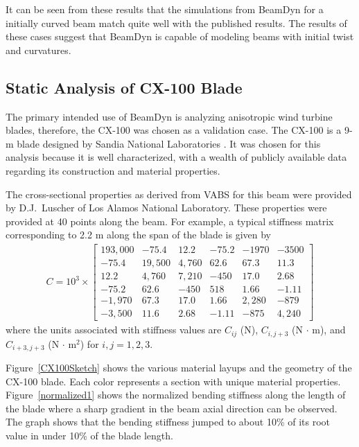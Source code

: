 \documentclass{aiaa-tc}
\begin{document}
It can be seen from these results that the simulations from BeamDyn for a initially curved beam match quite well with the published results. The results of these cases suggest that BeamDyn is capable of modeling beams with initial twist and curvatures.

\subsection{Static Analysis of CX-100 Blade}
The primary intended use of BeamDyn is analyzing anisotropic wind turbine blades, therefore, the CX-100 was chosen as a validation case. The CX-100 is a 9-m blade designed by Sandia National Laboratories \cite{paquette2006modeling}. It was chosen for this analysis because it is well characterized, with a wealth of publicly available data regarding its construction and material properties.

The cross-sectional properties as derived from VABS for this beam were provided by D.J.\ Luscher of Los Alamos National Laboratory. These properties were provided at 40 points along the beam. For example, a typical stiffness matrix corresponding to 2.2 m along the span of the blade is given by
\begin{align*}
C =10^3 \times \begin{bmatrix}
	193,000 & -75.4   & 12.2   & -75.2  & -1970    & -3500    \\
	-75.4  & 19,500 & 4,760   & 62.6  & 67.3    & 11.3    \\
	12.2  & 4,760   & 7,210 & -450  & 17.0    & 2.68    \\
	-75.2  & 62.6   & -450   & 518 & 1.66    & -1.11    \\
	-1,970  & 67.3   & 17.0   & 1.66  & 2,280 & -879    \\
	-3,500  & 11.6   & 2.68   & -1.11  & -875    & 4,240
\end{bmatrix}
\end{align*}
where the units associated with stiffness values are $C_{ij}$ (N), $C_{i,j+3}$ (N $\cdot$ m), and $C_{i+3,j+3}$ (N $\cdot$ m$^2$) for $i,j = 1,2,3$.

Figure~\ref{CX100Sketch} shows the various material layups and the geometry of the CX-100 blade. Each color represents a section with unique material properties. Figure~\ref{normalized1} shows the normalized bending stiffness along the length of the blade where a sharp gradient in the beam axial direction can be observed. The graph shows that the bending stiffness jumped to about 10\% of its root value in under 10\% of the blade length.
\end{document}
